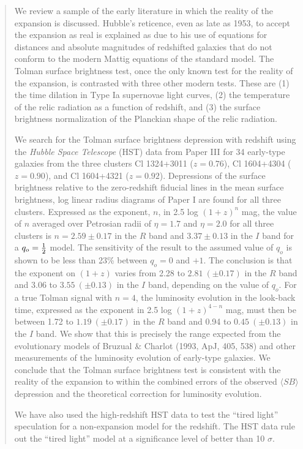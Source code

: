 \documentclass[preprint]{aastex}
\begin{document}
\begin{abstract}

We review a sample of the early literature in which the reality of the
expansion is discussed. Hubble's reticence, even as late as 1953, to
accept the expansion as real is explained as due to his use of
equations for distances and absolute magnitudes of redshifted galaxies
that do not conform to the modern Mattig equations of the standard
model. The Tolman surface brightness test, once the only known test
for the reality of the expansion, is contrasted with three other
modern tests.  These are (1) the time dilation in Type Ia supernovae
light curves, (2) the temperature of the relic radiation as a function
of redshift, and (3) the surface brightness normalization of the
Planckian shape of the relic radiation.

We search for the Tolman surface brightness depression with redshift
using the {\it Hubble Space Telescope} (HST) data from Paper III for
34 early-type galaxies from the three clusters Cl 1324+3011 ($z =
0.76$), Cl 1604+4304 ($z = 0.90$), and Cl 1604+4321 ($z =
0.92$). Depressions of the surface brightness relative to the
zero-redshift fiducial lines in the mean surface brightness, log
linear radius diagrams of Paper I are found for all three
clusters. Expressed as the exponent, $n$, in 2.5 log $(1 + z)^n$ mag,
the value of $n$ averaged over Petrosian radii of $\eta = 1.7$ and
$\eta = 2.0$ for all three clusters is $n = 2.59 \pm 0.17$ in the $R$
band and $3.37 \pm 0.13$ in the $I$ band for a $q_o = {1\over{2}}$
model.  The sensitivity of the result to the assumed value of $q_o$ is
shown to be less than 23\% between $q_o = 0$ and $+1$.  The conclusion
is that the exponent on $(1 + z)$ varies from 2.28 to $2.81~(\pm
0.17)$ in the $R$ band and 3.06 to $3.55~(\pm 0.13)$ in the $I$ band,
depending on the value of $q_o$. For a true Tolman signal with $n =
4$, the luminosity evolution in the look-back time, expressed as the
exponent in 2.5 log $(1 + z)^{4-n}$ mag, must then be between 1.72 to
$1.19~(\pm 0.17)$ in the $R$ band and 0.94 to $0.45~(\pm 0.13)$ in the
$I$ band. We show that this is precisely the range expected from the
evolutionary models of Bruzual \& Charlot (1993, ApJ, 405, 538) and
other measurements of the luminosity evolution of early-type
galaxies. We conclude that the Tolman surface brightness test is
consistent with the reality of the expansion to within the combined
errors of the observed $\langle SB \rangle$ depression and the
theoretical correction for luminosity evolution.

We have also used the high-redshift HST data to test the ``tired
light'' speculation for a non-expansion model for the redshift. The
HST data rule out the ``tired light'' model at a significance level of
better than 10 $\sigma$.

\end{abstract}
\end{document}
